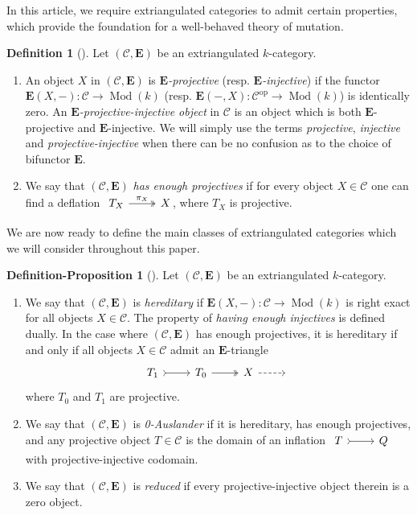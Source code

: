 \documentclass[10pt,twoside, a4paper,reqno]{amsart}
\newcommand{\op}{^{\mathrm{op}}}
\DeclareMathOperator{\Mod}{Mod}
\newcommand{\calC}{\mathcal{C}}
\newcommand{\E}{\mathbf{E}}
\theoremstyle{definition}
\newtheorem{definitionproposition}[theorem]{Definition-Proposition}
\newtheorem{definition}[theorem]{Definition}
\begin{document}
{In this article, we require {extriangulated categories} to admit certain {properties}, which provide the foundation for a well-behaved theory {of mutation}.}

\begin{definition}[{\cite[Def. 3.23, Prop. 3.24 and Def. 3.25]{NP19}}]
Let $(\calC,\E)$ be an extriangulated $k$-category.
    \begin{enumerate}
        \item An object $X$ in $(\calC,\E)$ is \textit{$\E$-projective} (resp. \textit{$\E$-injective}) if the functor $\E(X,-)\colon \calC\to \Mod({k})$ (resp. $\E(-,X)\colon \calC\op\to \Mod({k})$) is identically zero. An \textit{$\E$-projective-injective object} in $\calC$ is {an object which is} both $\E$-projective and $\E$-injective. We will simply use the terms \textit{projective}, \textit{injective} and \textit{projective-injective} when there can be no confusion as to the choice of bifunctor $\E$.
        \item We say that $(\calC,\E)$ \textit{has enough projectives} if for every object ${X} \in \calC$ one can find a deflation $\begin{tikzcd} T_X \arrow[r,two heads,"\pi_X"] & X\end{tikzcd}\!\!$, where $T_X$ is projective.
    \end{enumerate}    
\end{definition}

We are now ready to define the main classes of extriangulated categories which we will consider throughout this paper. 

\begin{definitionproposition}[{\cite[Prop. 2.1, Def. 2.3 and Def. 3.7]{GNP23}}]\label{defprop:0Aus}
Let $(\calC,\E)$ be an extriangulated $k$-category.
\begin{enumerate}
    \item We say that $(\calC,\E)$ is \textit{hereditary} if $\E(X,-)\colon \calC\to \Mod(k)$ is right exact for all objects $X \in \calC$. The property of \textit{having enough injectives} is defined dually.
    In the case where $(\calC,\E)$ has enough projectives, it is hereditary if and only if all objects $X\in\calC$ admit an $\E$-triangle 
    \begin{equation*}
        \begin{tikzcd} T_1\arrow[r,tail] &  T_0 \arrow[r,two heads] & X \arrow[r,dashed] & {} \end{tikzcd}
    \end{equation*}
    where $T_0$ and $T_1$ are projective.
        \item We say that $(\calC,\E)$ is \textit{0-Auslander} if it is hereditary, has enough projectives, and any projective object $T\in\calC$ is the domain of an inflation $\begin{tikzcd} T \arrow[r,tail] & Q \end{tikzcd}$ with projective-injective codomain.
    \item We say that $(\calC,\E)$ is \textit{reduced} if every projective-injective object therein is a zero object.
\end{enumerate}
\end{definitionproposition}
\end{document}
